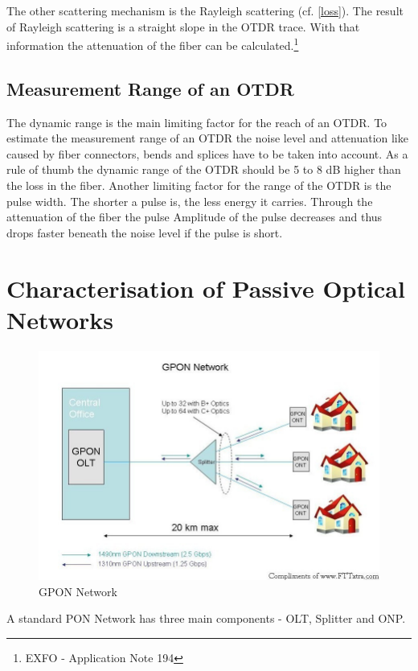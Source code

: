 The other scattering mechanism is the Rayleigh scattering (cf. \ref{loss}). The result of Rayleigh scattering is a straight slope in the OTDR trace. With that information the attenuation of the fiber can be calculated.\footnote[1]{EXFO - Application Note 194}

\subsection{Measurement Range of an OTDR}
The dynamic range is the main limiting factor for the reach of an OTDR. To estimate the measurement range of an OTDR the noise level and attenuation like caused by fiber connectors, bends and splices have to be taken into account. As a rule of thumb the dynamic range of the OTDR should be 5 to 8 dB higher than the loss in the fiber.
Another limiting factor for the range of the OTDR is the pulse width. The shorter a pulse is, the less energy it carries. Through the attenuation of the fiber the pulse Amplitude of the pulse decreases and thus drops faster beneath the noise level if the pulse is short.

\section{Characterisation of Passive Optical Networks}

\begin{figure}%
\includegraphics[width=\columnwidth]{grafiken/gpon.jpg}%
\caption{GPON Network}%
\label{}%
\end{figure}

A standard PON Network has three main components - OLT, Splitter and ONP.

